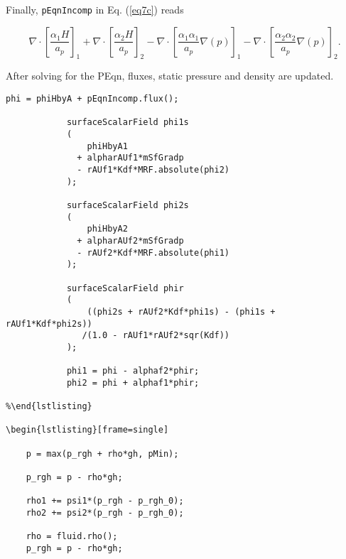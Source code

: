 \documentclass[a4paper, 12 pt, fleqn]{article}
\begin{document}
{\begin{lstlisting}[frame=single]
\end{lstlisting}

Finally, {\tt pEqnIncomp} in Eq. (\ref{eq7c}) reads

\begin{equation}
\nabla \cdot \left[ \frac{\alpha_1 H}{a_p} \right]_1 + \nabla \cdot \left[ \frac{\alpha_2 H}{a_p} \right]_2 - \nabla \cdot \left[ \frac{\alpha_1 \alpha_1}{a_p}\nabla(p) \right]_1 - \nabla \cdot \left[ \frac{\alpha_2 \alpha_2}{a_p}\nabla(p)  \right]_2. 
\end{equation}

 After solving for the PEqn, fluxes, static pressure and density are updated. 
 
\begin{lstlisting}[frame=single] 
            phi = phiHbyA + pEqnIncomp.flux();

            surfaceScalarField phi1s
            (
                phiHbyA1
              + alpharAUf1*mSfGradp
              - rAUf1*Kdf*MRF.absolute(phi2)
            );

            surfaceScalarField phi2s
            (
                phiHbyA2
              + alpharAUf2*mSfGradp
              - rAUf2*Kdf*MRF.absolute(phi1)
            );

            surfaceScalarField phir
            (
                ((phi2s + rAUf2*Kdf*phi1s) - (phi1s + rAUf1*Kdf*phi2s))
               /(1.0 - rAUf1*rAUf2*sqr(Kdf))
            );

            phi1 = phi - alphaf2*phir;
            phi2 = phi + alphaf1*phir;
            
%\end{lstlisting} 

\begin{lstlisting}[frame=single] 

    p = max(p_rgh + rho*gh, pMin);

    p_rgh = p - rho*gh;

    rho1 += psi1*(p_rgh - p_rgh_0);
    rho2 += psi2*(p_rgh - p_rgh_0);

    rho = fluid.rho();
    p_rgh = p - rho*gh;

\end{lstlisting}  



}
\end{document}
